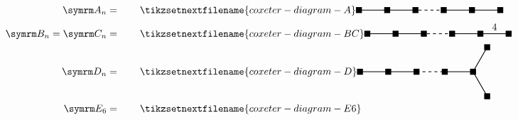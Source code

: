 \begin{align}
    \A[n] &= \qquad
    \tikzsetnextfilename{coxeter-diagram-A}
    \begin{tikzpicture}[coxeter node/.style = {fill, inner sep=3pt}, coxeter wire/.style = {thick}]
        \draw [coxeter wire] (0, 0) -- ++ (2, 0);
        \draw [coxeter wire, dashed] (1.9, 0) -- ++ (1.05, 0);
        \draw [coxeter wire] (3, 0) -- (5, 0);
        \node [coxeter node] at (0, 0) {};
        \node [coxeter node] at (1, 0) {};
        \node [coxeter node] at (2, 0) {};
        \node [coxeter node] at (3, 0) {};
        \node [coxeter node] at (4, 0) {};
        \node [coxeter node] at (5, 0) {};
    \end{tikzpicture}
    \\
    \B[n] = \C[n] &= \qquad
    \tikzsetnextfilename{coxeter-diagram-BC}
    \begin{tikzpicture}[coxeter node/.style = {fill, inner sep=3pt}, coxeter wire/.style = {thick}]
        \draw [coxeter wire] (0, 0) -- ++ (2, 0);
        \draw [coxeter wire, dashed] (1.9, 0) -- ++ (1.05, 0);
        \draw [coxeter wire] (3, 0) -- (5, 0);
        \node [coxeter node] at (0, 0) {};
        \node [coxeter node] at (1, 0) {};
        \node [coxeter node] at (2, 0) {};
        \node [coxeter node] at (3, 0) {};
        \node [coxeter node] at (4, 0) {};
        \node [coxeter node] at (5, 0) {};
        \node [above] at (4.5, 0) {\(4\)};
    \end{tikzpicture}
    \\
    \D[n] &= \qquad
    \tikzsetnextfilename{coxeter-diagram-D}
    \begin{tikzpicture}[coxeter node/.style = {fill, inner sep=3pt}, coxeter wire/.style = {thick}, baseline=-0.1cm]
        \draw [coxeter wire] (3, 0) -- (4, 0);
        \draw [coxeter wire] (4, 0) -- ++ (60:1) coordinate (A);
        \draw [coxeter wire] (4, 0) -- ++ (-60:1) coordinate (B);
        \draw [coxeter wire] (0, 0) -- ++ (2, 0);
        \draw [coxeter wire, dashed] (2, 0) -- ++ (1, 0);
        \node [coxeter node] at (0, 0) {};
        \node [coxeter node] at (1, 0) {};
        \node [coxeter node] at (2, 0) {};
        \node [coxeter node] at (3, 0) {};
        \node [coxeter node] at (4, 0) {};
        \node [coxeter node] at (A) {};
        \node [coxeter node] at (B) {};
    \end{tikzpicture}
    \\
    \E[6] &= \qquad
    \tikzsetnextfilename{coxeter-diagram-E6}
    \begin{tikzpicture}[coxeter node/.style = {fill, inner sep=3pt}, coxeter wire/.style = {thick}, baseline=-0.1cm]

\end{tikzpicture}
\end{align}
